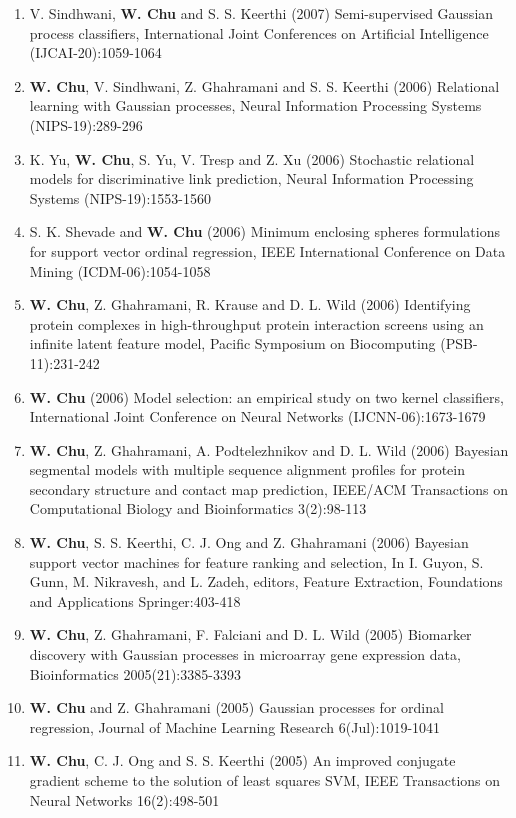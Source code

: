 \documentclass[line,10pt,final]{res}
\begin{document}
\begin{resume}
\begin{enumerate}
\item V. Sindhwani,  {\bf W. Chu} and S. S. Keerthi (2007) Semi-supervised Gaussian process classifiers, International Joint Conferences on Artificial Intelligence (IJCAI-20):1059-1064  
\item  {\bf W. Chu}, V. Sindhwani, Z. Ghahramani and S. S. Keerthi (2006) Relational learning with Gaussian processes, Neural Information Processing Systems (NIPS-19):289-296  
\item K. Yu,  {\bf W. Chu}, S. Yu, V. Tresp and Z. Xu (2006) Stochastic relational models for discriminative link prediction, Neural Information Processing Systems (NIPS-19):1553-1560  
\item S. K. Shevade and  {\bf W. Chu} (2006) Minimum enclosing spheres formulations for support vector ordinal regression, IEEE International Conference on Data Mining (ICDM-06):1054-1058  
\item  {\bf W. Chu}, Z. Ghahramani, R. Krause and D. L. Wild  (2006)  Identifying protein complexes in high-throughput protein interaction screens using an infinite latent feature model, Pacific Symposium on Biocomputing (PSB-11):231-242  
\item  {\bf W. Chu} (2006)  Model selection: an empirical study on two kernel classifiers, International Joint Conference on Neural Networks (IJCNN-06):1673-1679
\item  {\bf W. Chu}, Z. Ghahramani, A. Podtelezhnikov and D. L. Wild (2006) Bayesian segmental models with multiple sequence alignment profiles for protein secondary structure and contact map prediction, IEEE/ACM Transactions on Computational Biology and Bioinformatics 3(2):98-113  
\item  {\bf W. Chu}, S. S. Keerthi, C. J. Ong and Z. Ghahramani (2006)  Bayesian support vector machines for feature ranking and selection,   In I. Guyon, S. Gunn, M. Nikravesh, and L. Zadeh, editors, Feature Extraction, Foundations and Applications   Springer:403-418
\item  {\bf W. Chu}, Z. Ghahramani, F. Falciani and D. L. Wild (2005)  Biomarker discovery with Gaussian processes in microarray gene expression data,  Bioinformatics 2005(21):3385-3393  
\item  {\bf W. Chu} and Z. Ghahramani (2005)  Gaussian processes for ordinal regression,  Journal of Machine Learning Research 6(Jul):1019-1041  
\item  {\bf W. Chu}, C. J. Ong and S. S. Keerthi (2005)  An improved conjugate gradient scheme to the solution of least squares SVM,  IEEE Transactions on Neural Networks 16(2):498-501  

\end{enumerate}
\end{resume}
\end{document}
